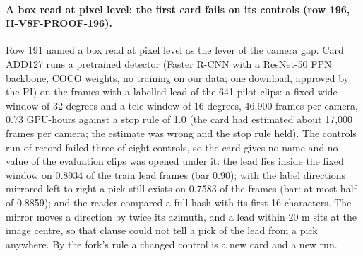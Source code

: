\paragraph{A box read at pixel level: the first card fails on its controls (row 196, H-V8F-PROOF-196).} Row 191 named a box read at pixel level as the lever of the camera gap. Card ADD127 runs a pretrained detector (Faster R-CNN with a ResNet-50 FPN backbone, COCO weights, no training on our data; one download, approved by the PI) on the frames with a labelled lead of the 641 pilot clips: a fixed wide window of 32 degrees and a tele window of 16 degrees, 46,900 frames per camera, 0.73 GPU-hours against a stop rule of 1.0 (the card had estimated about 17,000 frames per camera; the estimate was wrong and the stop rule held). The controls run of record failed three of eight controls, so the card gives no name and no value of the evaluation clips was opened under it: the lead lies inside the fixed window on 0.8934 of the train lead frames (bar 0.90); with the label directions mirrored left to right a pick still exists on 0.7583 of the frames (bar: at most half of 0.8859); and the reader compared a full hash with its first 16 characters. The mirror moves a direction by twice its azimuth, and a lead within 20 m sits at the image centre, so that clause could not tell a pick of the lead from a pick anywhere. By the fork's rule a changed control is a new card and a new run.
